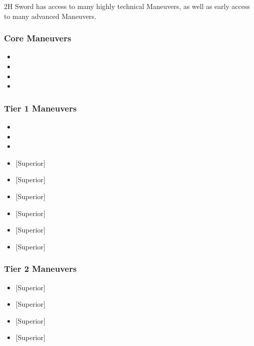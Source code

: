 \documentclass[oneside,11pt,english]{book}
\begin{document}
2H Sword has access to many highly technical Maneuvers, as well as early access to many advanced Maneuvers. 

\subsubsection{Core Maneuvers}
\vspace{-5pt}\begin{itemize}
	[itemsep=0.5mm]
	\item {}
	\item {}
	\item {}
	\item {}
\end{itemize}
\subsubsection{Tier 1 Maneuvers}
\vspace{-5pt}\begin{itemize}
	[itemsep=0.5mm]
	\item {}
	\item {}
	\item {}
	\item {} [Superior]
	\item {} [Superior]
	\item {} [Superior]
	\item {} [Superior]
	\item {} [Superior]
	\item {} [Superior]
\end{itemize}
\subsubsection{Tier 2 Maneuvers}
\vspace{-5pt}\begin{itemize}
	[itemsep=0.5mm]
	\item {} [Superior]
	\item {} [Superior]
	\item {} [Superior]
	\item {} [Superior]
\end{itemize}
\end{document}
